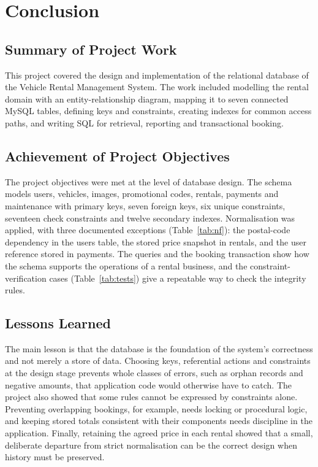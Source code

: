 \documentclass[10pt,a4paper]{report}
\begin{document}
\chapter{Conclusion}

\section{Summary of Project Work}
This project covered the design and implementation of the relational database of the Vehicle Rental Management System. The work included modelling the rental domain with an entity-relationship diagram, mapping it to seven connected MySQL tables, defining keys and constraints, creating indexes for common access paths, and writing SQL for retrieval, reporting and transactional booking.

\section{Achievement of Project Objectives}
The project objectives were met at the level of database design. The schema models users, vehicles, images, promotional codes, rentals, payments and maintenance with primary keys, seven foreign keys, six unique constraints, seventeen check constraints and twelve secondary indexes. Normalisation was applied, with three documented exceptions (Table~\ref{tab:nf}): the postal-code dependency in the users table, the stored price snapshot in rentals, and the user reference stored in payments. The queries and the booking transaction show how the schema supports the operations of a rental business, and the constraint-verification cases (Table~\ref{tab:tests}) give a repeatable way to check the integrity rules.

\section{Lessons Learned}
The main lesson is that the database is the foundation of the system's correctness and not merely a store of data. Choosing keys, referential actions and constraints at the design stage prevents whole classes of errors, such as orphan records and negative amounts, that application code would otherwise have to catch. The project also showed that some rules cannot be expressed by constraints alone. Preventing overlapping bookings, for example, needs locking or procedural logic, and keeping stored totals consistent with their components needs discipline in the application. Finally, retaining the agreed price in each rental showed that a small, deliberate departure from strict normalisation can be the correct design when history must be preserved.
\end{document}
